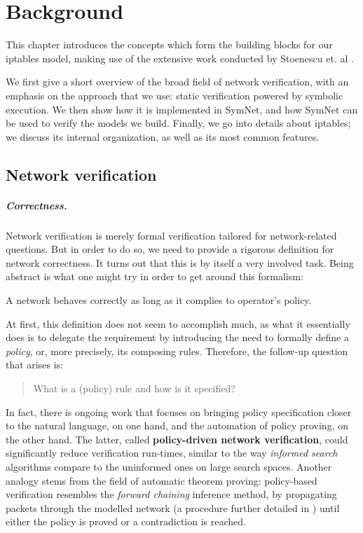 \chapter{Background}

This chapter introduces the concepts which form the building blocks for our
iptables model, making use of the extensive work conducted by Stoenescu et. al
\cite{stoenescu2013symnet, stoenescu2016symnet}.

We first give a short overview of the broad field of network verification, with
an emphasis on the approach that we use: static verification powered by
symbolic execution.  We then show how it is implemented in SymNet, and how
SymNet can be used to verify the models we build.  Finally, we go into details
about iptables; we discuss its internal organization, as well as its most
common features.


\section{Network verification}\label{sec:network-verification}

\paragraph{Correctness.}\label{par:correctness}
Network verification is merely formal verification tailored for network-related
questions.  But in order to do so, we need to provide a rigorous definition for
network correctness.  It turns out that this is by itself a very involved task.
Being abstract is what one might try in order to get around this formalism:

\begin{definition}
\label{def:full-correctness}
A network behaves correctly as long as it complies to operator's policy.
\end{definition}

At first, this definition does not seem to accomplish much, as what it
essentially does is to delegate the requirement by introducing the need to
formally define a \emph{policy}, or, more precisely, its composing rules.
Therefore, the follow-up question that arises is:

\begin{quote}
What is a (policy) rule and how is it specified?
\end{quote}

In fact, there is ongoing work that focuses on bringing policy specification
closer to the natural language, on one hand, and the automation of policy
proving, on the other hand.  The latter, called \textbf{policy-driven network
verification}, could significantly reduce verification run-times, similar to
the way \emph{informed search} algorithms compare to the uninformed ones on
large search spaces.  Another analogy stems from the field of automatic theorem
proving: policy-based verification resembles the \emph{forward chaining}
inference method, by propagating packets through the modelled network (a
procedure further detailed in ) until
either the policy is proved or a contradiction is reached.

